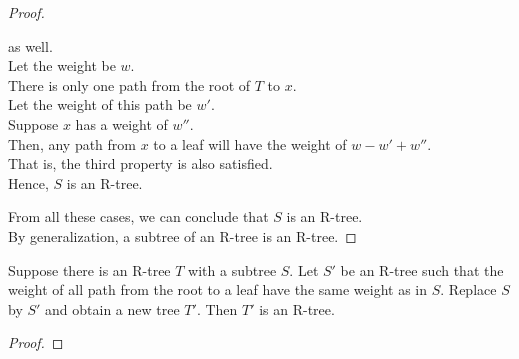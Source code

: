 \documentclass[10pt]{article}
\begin{document}
\begin{enumerate}
\begin{proof}
\begin{addmargin}[1em]{0em}
			as well. \\
			Let the weight be $w$. \\
			There is only one path from the root of $T$ to $x$. \\
			Let the weight of this path be $w'$. \\
			Suppose $x$ has a weight of $w''$. \\
			Then, any path from $x$ to a leaf will have the weight of
			$w-w'+w''$. \\
			That is, the third property is also satisfied. \\
			Hence, $S$ is an R-tree.
		\end{addmargin}
		From all these cases, we can conclude that $S$ is an R-tree. \\
		By generalization, a subtree of an R-tree is an R-tree. 
	\end{proof}

	 Suppose there is an R-tree $T$ with a subtree $S$. Let
		$S'$ be an R-tree such that the weight of all path from the root to a
		leaf have the same weight as in $S$. Replace $S$ by $S'$ and obtain a
		new tree $T'$. Then $T'$ is an R-tree. 
	\begin{proof}
	\end{proof}


\end{enumerate}
\end{document}
